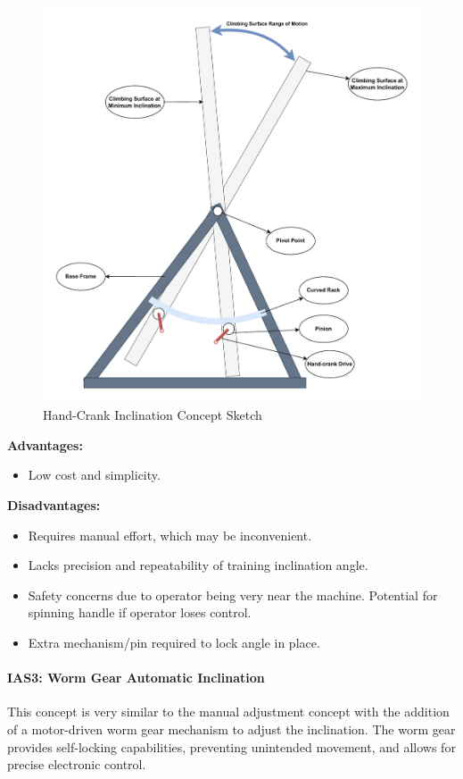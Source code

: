 \begin{figure}[H]
    \centering
    \includegraphics[width=0.6\linewidth]{figs/concept_design/Handcrank_Concept.pdf}
    \caption{Hand-Crank Inclination Concept Sketch}
    \label{fig:handcrank-concept}
\end{figure}

\textbf{Advantages:}
\begin{itemize}
    \item Low cost and simplicity.
\end{itemize}

\textbf{Disadvantages:}
\begin{itemize}
    \item Requires manual effort, which may be inconvenient.
    \item Lacks precision and repeatability of training inclination angle.
    \item Safety concerns due to operator being very near the machine. Potential for spinning handle if operator loses control.
    \item Extra mechanism/pin required to lock angle in place.
\end{itemize}

\paragraph{IAS3: Worm Gear Automatic Inclination}

This concept is very similar to the manual adjustment concept with the addition of a motor-driven worm gear mechanism to adjust the inclination. The worm gear provides self-locking capabilities, preventing unintended movement, and allows for precise electronic control.

